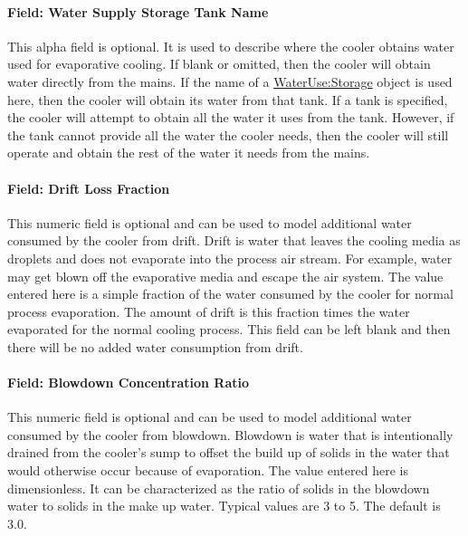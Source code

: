 \paragraph{Field: Water Supply Storage Tank Name}\label{field-water-supply-storage-tank-name-1}

This alpha field is optional. It is used to describe where the cooler obtains water used for evaporative cooling. If blank or omitted, then the cooler will obtain water directly from the mains. If the name of a \hyperref[waterusestorage]{WaterUse:Storage} object is used here, then the cooler will obtain its water from that tank. If a tank is specified, the cooler will attempt to obtain all the water it uses from the tank. However, if the tank cannot provide all the water the cooler needs, then the cooler will still operate and obtain the rest of the water it needs from the mains.

\paragraph{Field: Drift Loss Fraction}\label{field-drift-loss-fraction}

This numeric field is optional and can be used to model additional water consumed by the cooler from drift. Drift is water that leaves the cooling media as droplets and does not evaporate into the process air stream. For example, water may get blown off the evaporative media and escape the air system. The value entered here is a simple fraction of the water consumed by the cooler for normal process evaporation. The amount of drift is this fraction times the water evaporated for the normal cooling process. This field can be left blank and then there will be no added water consumption from drift.

\paragraph{Field: Blowdown Concentration Ratio}\label{field-blowdown-concentration-ratio-000}

This numeric field is optional and can be used to model additional water consumed by the cooler from blowdown. Blowdown is water that is intentionally drained from the cooler's sump to offset the build up of solids in the water that would otherwise occur because of evaporation. The value entered here is dimensionless. It can be characterized as the ratio of solids in the blowdown water to solids in the make up water. Typical values are 3 to 5. The default is 3.0.

